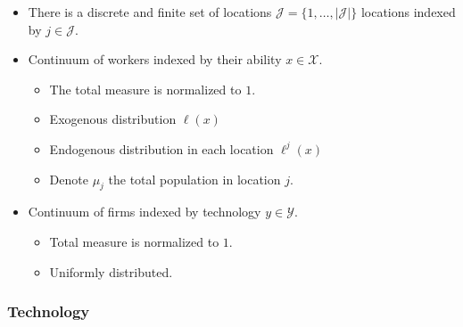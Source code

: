 \documentclass[
  letterpaper,
  DIV=11,
  numbers=noendperiod]{scrartcl}
\providecommand{\tightlist}{%
  \setlength{\itemsep}{0pt}\setlength{\parskip}{0pt}}\usepackage{longtable,booktabs,array}
\begin{document}
\begin{itemize}
\tightlist
\item
  There is a discrete and finite set of locations
  \(\mathcal{J}=\{1,\dots,|\mathcal{J}|\}\) locations indexed by
  \(j\in\mathcal{J}\).
\item
  Continuum of workers indexed by their ability \(x\in \mathcal{X}\).

  \begin{itemize}
  \tightlist
  \item
    The total measure is normalized to \(1\).
  \item
    Exogenous distribution \(\ell(x)\)
  \item
    Endogenous distribution in each location \(\ell^{j}(x)\)
  \item
    Denote \(\mu_j\) the total population in location \(j\).
  \end{itemize}
\item
  Continuum of firms indexed by technology \(y\in \mathcal{Y}\).

  \begin{itemize}
  \tightlist
  \item
    Total measure is normalized to \(1\).
  \item
    Uniformly distributed.
  \end{itemize}
\end{itemize}

\hypertarget{technology}{%
\subsubsection{Technology}\label{technology}}
\end{document}
